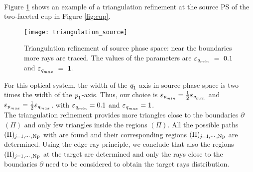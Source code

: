 \\ \indent Figure \ref{fig:triangulation_refinement} shows an example of a triangulation refinement at the source PS of the two-faceted cup in Figure \ref{fig:cup}.
\begin{figure}[h]
  \begin{center}
  \texttt{[image: triangulation\_source]}
  \end{center}
  \caption{Triangulation refinement of source phase space:
  near the boundaries more rays are traced.
    The values of the parameters are $\varepsilon_{\textit{q}_{min}}~=~ 0.1$ and $\varepsilon_{\textit{q}_{max}}~=~1$.}
   \label{fig:triangulation_refinement}
  \end{figure}
For this optical system, the width of the $\textit{q}_1$-axis in source phase space is two times the width of the $\textit{p}_1$-axis.
Thus, our choice is $\varepsilon_{\textit{p}_{min}}=\frac{1}{2}\varepsilon_{\textit{q}_{min}}$ and $\varepsilon_{\textit{p}_{max}} = \frac{1}{2}\varepsilon_{\textit{q}_{max}}$.
with $\varepsilon_{\textit{q}_{min}}=0.1$ and $\varepsilon_{\textit{q}_{max}}=1$.
\\ \indent
The triangulation refinement provides more triangles close to the boundaries $\partial$$(\Pi)$ and only few triangles inside the regions $(\Pi)$.
All the possible paths $(\Pi)_{\textit{j} = 1, \cdots, \textrm{Np}}$ with are found and their corresponding regions $(\Pi)_{\textit{j} = 1, \cdots, \textrm{Np}}$ are determined. Using the edge-ray principle, we conclude that also the regions $(\Pi)_{\textit{j} = 1, \cdots, \textrm{Np}}$ at the target are determined and only the rays close to the boundaries
$\partial$ need to be considered to obtain the target rays distribution.
